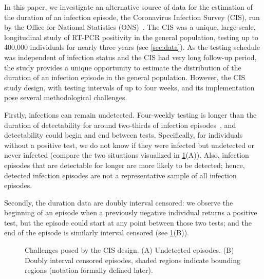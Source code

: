 \documentclass[referee,useAMS,usenatbib]{biom}
\begin{document}
In this paper, we investigate an alternative source of data for the estimation of the duration of an infection episode, the Coronavirus Infection Survey (CIS), run by the Office for National Statistics (ONS)~\citep{CIS}.
The CIS was a unique, large-scale, longitudinal study of RT-PCR positivity in the general population, testing up to 400,000 individuals for nearly three years (see \cref{sec:data}).
As the testing schedule was independent of infection status and the CIS had very long follow-up period, the study provides a unique opportunity to estimate the distribution of the duration of an infection episode in the general population.
However, the CIS study design, with testing intervals of up to four weeks, and its implementation pose several methodological challenges.

Firstly, infections can remain undetected.
Four-weekly testing is longer than the duration of detectability for around two-thirds of infection episodes~\citep{killingleySafety}, and detectability could begin and end between tests.
Specifically, for individuals without a positive test, we do not know if they were infected but undetected or never infected (compare the two situations visualized in \cref{fig:challenges}(A)).
Also, infection episodes that are detectable for longer are more likely to be detected; hence, detected infection episodes are not a representative sample of all infection episodes.


Secondly, the duration data are doubly interval censored: we observe the beginning of an episode when a previously negative individual returns a positive test, but the episode could start at any point between those two tests; and the end of the episode is similarly interval censored (see \cref{fig:challenges}(B)).

\begin{figure}
  
  \caption{%
    Challenges posed by the CIS design.
    (A) Undetected episodes.
    (B) Doubly interval censored episodes, shaded regions indicate bounding regions (notation formally defined later).
  }
  \label{fig:challenges}
\end{figure}
\end{document}
